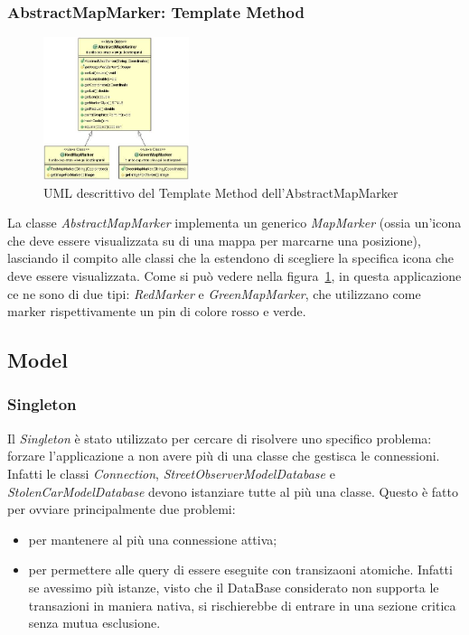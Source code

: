 \documentclass[a4paper,12pt]{report}
\begin{document}
    \subsubsection {AbstractMapMarker: Template Method}
    \begin{figure}
      \vspace{-60pt}
      \begin{center}
	  \includegraphics[width=0.38\textwidth]{images/UMLmapMarker}
	\caption{UML descrittivo del Template Method dell'AbstractMapMarker}
	\label{fig:UMLmapMarker}
      \end{center}
      \vspace{-60pt}
    \end{figure}

    La classe \textit{AbstractMapMarker} implementa un generico 
\textit{MapMarker} (ossia un'icona che deve essere visualizzata su di una mappa 
per marcarne una posizione), lasciando il compito alle classi che la estendono 
di scegliere la specifica icona che deve essere visualizzata. Come si può 
vedere nella figura~\ref{fig:UMLmapMarker}, in questa applicazione ce 
ne sono di due tipi: \textit{RedMarker} e \textit{GreenMapMarker}, che 
utilizzano come marker rispettivamente un pin di colore rosso e verde.


  \subsection{Model}
  
    \subsubsection {Singleton}
    Il \textit{Singleton} è stato utilizzato per cercare di risolvere uno 
specifico problema: forzare l'applicazione a non avere più di una classe che 
gestisca le connessioni. Infatti le classi \textit{Connection}, 
\textit{StreetObserverModelDatabase} e \textit{StolenCarModelDatabase} 
devono istanziare tutte al più una classe. Questo è fatto per ovviare 
principalmente due problemi: 
    \begin{itemize}
      \item per mantenere al più una connessione attiva;
      \item per permettere alle query di essere eseguite con transizaoni 
atomiche. Infatti se avessimo più istanze, visto che il DataBase considerato 
non supporta le transazioni in maniera nativa, si rischierebbe di entrare in 
una sezione critica senza mutua esclusione.
    \end{itemize}
\end{document}
